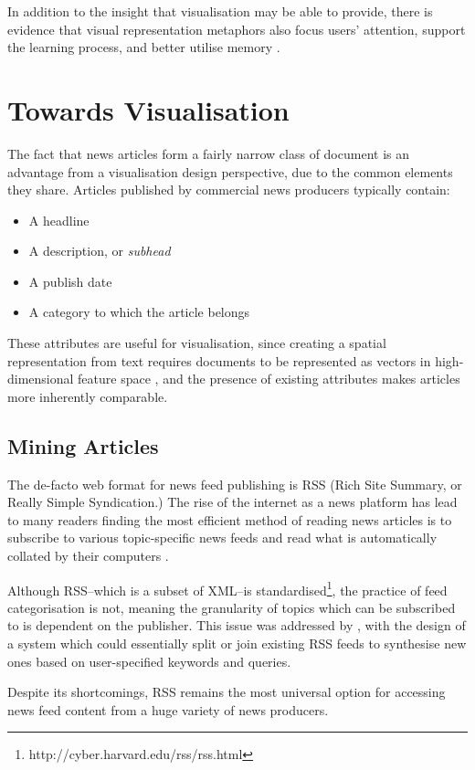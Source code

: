 In addition to the insight that visualisation may be able to provide, there is evidence that visual representation metaphors also focus users' attention, support the learning process, and better utilise memory \citep{LearningFromArchitects}.

\section{Towards Visualisation}

The fact that news articles form a fairly narrow class of document is an advantage from a visualisation design perspective, due to the common elements they share. Articles published by commercial news producers typically contain:
\begin{itemize}
	\item A headline
	\item A description, or \textit{subhead}
	\item A publish date
	\item A category to which the article belongs
\end{itemize}
These attributes are useful for visualisation, since creating a spatial representation from text requires documents to be represented as vectors in high-dimensional feature space \citep{VisualizingTheNonVisual}, and the presence of existing attributes makes articles more inherently comparable. 

\subsection{Mining Articles}
The de-facto web format for news feed publishing is RSS (Rich Site Summary, or Really Simple Syndication.) The rise of the internet as a news platform has lead to many readers finding the most efficient method of reading news articles is to subscribe to various topic-specific news feeds and read what is automatically collated by their computers \citep{Nreader}.

Although RSS--which is a subset of XML--is standardised\footnote{http://cyber.harvard.edu/rss/rss.html}, the practice of feed categorisation is not, meaning the granularity of topics which can be subscribed to is dependent on the publisher. This issue was addressed by \citep{PersonalNewsRss}, with the design of a system which could essentially split or join existing RSS feeds to synthesise new ones based on user-specified keywords and queries.

Despite its shortcomings, RSS remains the most universal option for accessing news feed content from a huge variety of news producers. 
\citep{MiningAndVisualisingInformationFromRSSFeeds} 
